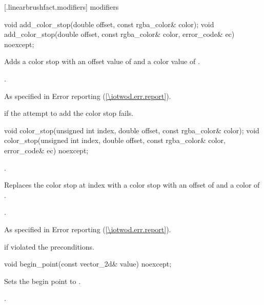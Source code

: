  [\iotwod.linearbrushfact.modifiers] { modifiers}

\begin{itemdecl}
    void add_color_stop(double offset, const rgba_color& color);
    void add_color_stop(double offset, const rgba_color& color, 
      error_code& ec) noexcept;
\end{itemdecl}
\begin{itemdescr}
	\pnum
	\effects
	Adds a color stop with an offset value of  and a color value of .
	
	\pnum
	\postconditions
	.
	
	\pnum
	\throws
	As specified in Error reporting (\ref{\iotwod.err.report}).
	
	\pnum
	\errors
	 if the attempt to add the color stop fails.
	 
\end{itemdescr}

\begin{itemdecl}
    void color_stop(unsigned int index, double offset,
      const rgba_color& color);
    void color_stop(unsigned int index, double offset,
      const rgba_color& color, error_code& ec) noexcept;
\end{itemdecl}
\begin{itemdescr}
	\pnum
	\requires
	.
	
	\pnum
	\effects
	Replaces the color stop at index  with a color stop with an offset of  and a color of .

	\pnum
	\postconditions
	.
	
	\pnum
	\throws
	As specified in Error reporting (\ref{\iotwod.err.report}).
	
	\pnum
	\errors
	 if  violated the preconditions.
\end{itemdescr}

\begin{itemdecl}
    void begin_point(const vector_2d& value) noexcept;
\end{itemdecl}
\begin{itemdescr}
	\pnum
	\effects
	Sets the begin point to .

	\pnum
	\postconditions
	.
	
\end{itemdescr}

